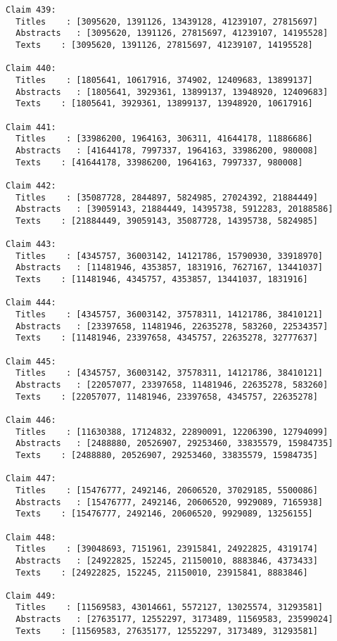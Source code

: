 \documentclass[11pt]{article}
\begin{document}
\begin{Verbatim}[commandchars=\\\{\}]
Claim 439:
  Titles    : [3095620, 1391126, 13439128, 41239107, 27815697]
  Abstracts   : [3095620, 1391126, 27815697, 41239107, 14195528]
  Texts    : [3095620, 1391126, 27815697, 41239107, 14195528]

Claim 440:
  Titles    : [1805641, 10617916, 374902, 12409683, 13899137]
  Abstracts   : [1805641, 3929361, 13899137, 13948920, 12409683]
  Texts    : [1805641, 3929361, 13899137, 13948920, 10617916]

Claim 441:
  Titles    : [33986200, 1964163, 306311, 41644178, 11886686]
  Abstracts   : [41644178, 7997337, 1964163, 33986200, 980008]
  Texts    : [41644178, 33986200, 1964163, 7997337, 980008]

Claim 442:
  Titles    : [35087728, 2844897, 5824985, 27024392, 21884449]
  Abstracts   : [39059143, 21884449, 14395738, 5912283, 20188586]
  Texts    : [21884449, 39059143, 35087728, 14395738, 5824985]

Claim 443:
  Titles    : [4345757, 36003142, 14121786, 15790930, 33918970]
  Abstracts   : [11481946, 4353857, 1831916, 7627167, 13441037]
  Texts    : [11481946, 4345757, 4353857, 13441037, 1831916]

Claim 444:
  Titles    : [4345757, 36003142, 37578311, 14121786, 38410121]
  Abstracts   : [23397658, 11481946, 22635278, 583260, 22534357]
  Texts    : [11481946, 23397658, 4345757, 22635278, 32777637]

Claim 445:
  Titles    : [4345757, 36003142, 37578311, 14121786, 38410121]
  Abstracts   : [22057077, 23397658, 11481946, 22635278, 583260]
  Texts    : [22057077, 11481946, 23397658, 4345757, 22635278]

Claim 446:
  Titles    : [11630388, 17124832, 22890091, 12206390, 12794099]
  Abstracts   : [2488880, 20526907, 29253460, 33835579, 15984735]
  Texts    : [2488880, 20526907, 29253460, 33835579, 15984735]

Claim 447:
  Titles    : [15476777, 2492146, 20606520, 37029185, 5500086]
  Abstracts   : [15476777, 2492146, 20606520, 9929089, 7165938]
  Texts    : [15476777, 2492146, 20606520, 9929089, 13256155]

Claim 448:
  Titles    : [39048693, 7151961, 23915841, 24922825, 4319174]
  Abstracts   : [24922825, 152245, 21150010, 8883846, 4373433]
  Texts    : [24922825, 152245, 21150010, 23915841, 8883846]

Claim 449:
  Titles    : [11569583, 43014661, 5572127, 13025574, 31293581]
  Abstracts   : [27635177, 12552297, 3173489, 11569583, 23599024]
  Texts    : [11569583, 27635177, 12552297, 3173489, 31293581]


\end{Verbatim}
\end{document}
